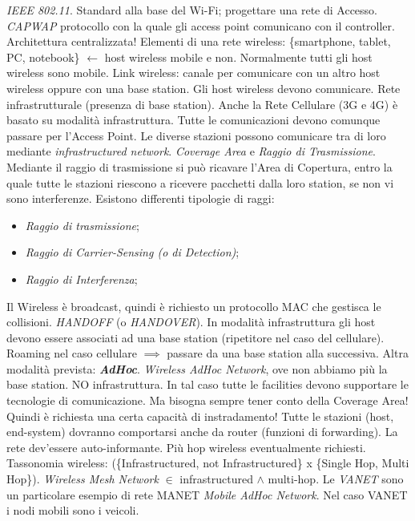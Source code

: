 \textit{IEEE 802.11}. Standard alla base del Wi-Fi; progettare una rete di Accesso. \textit{CAPWAP} protocollo con la quale gli access point comunicano con il controller. Architettura centralizzata! Elementi di una rete wireless: \{smartphone, tablet, PC, notebook\} $\leftarrow$ host wireless mobile e non. Normalmente tutti gli host wireless sono mobile. Link wireless: canale per comunicare con un altro host wireless oppure con una base station. Gli host wireless devono comunicare. Rete infrastrutturale (presenza di base station). Anche la Rete Cellulare (3G e 4G) è basato su modalità infrastruttura. Tutte le comunicazioni devono comunque passare per l'Access Point. Le diverse stazioni possono comunicare tra di loro mediante \textit{infrastructured network}. \textit{Coverage Area} e \textit{Raggio di Trasmissione}. Mediante il raggio di trasmissione si può ricavare l'Area di Copertura, entro la quale tutte le stazioni riescono a ricevere pacchetti dalla loro station, se non vi sono interferenze. Esistono differenti tipologie di raggi:

\begin{itemize}

\item{\textit{Raggio di trasmissione}};
\item{\textit{Raggio di Carrier-Sensing (o di Detection)}};
\item{\textit{Raggio di Interferenza}};
\end{itemize}

Il Wireless è broadcast, quindi è richiesto un protocollo MAC che gestisca le collisioni. \textit{HANDOFF} (o \textit{HANDOVER}). In modalità infrastruttura gli host devono essere associati ad una base station (ripetitore nel caso del cellulare). Roaming nel caso cellulare $\implies$ passare da una base station alla successiva. Altra modalità prevista: \textit{\textbf{AdHoc}}. \textit{Wireless AdHoc Network}, ove non abbiamo più la base station. NO infrastruttura. In tal caso tutte le facilities devono supportare le tecnologie di comunicazione. Ma bisogna sempre tener conto della Coverage Area! Quindi è richiesta una certa capacità di instradamento! Tutte le stazioni (host, end-system) dovranno comportarsi anche da router (funzioni di forwarding). La rete dev'essere auto-informante. Più hop wireless eventualmente richiesti. Tassonomia wireless: (\{Infrastructured, not Infrastructured\} x \{Single Hop, Multi Hop\}). \textit{Wireless Mesh Network} $\in$ infrastructured $\land$ multi-hop. Le \textit{VANET} sono un particolare esempio di rete MANET \textit{Mobile AdHoc Network}. Nel caso VANET i nodi mobili sono i veicoli.

